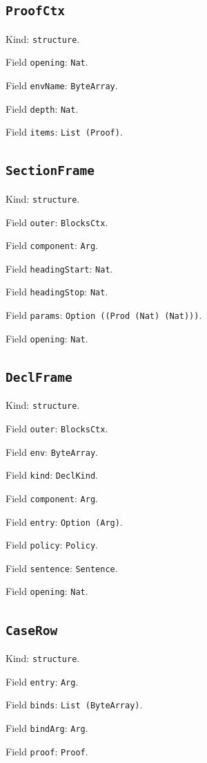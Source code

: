 \documentclass[11pt]{article}
\begin{document}
\subsection*{\texttt{ProofCtx}}
\noindent Kind: \texttt{structure}.\par
\noindent Field \texttt{opening}: \texttt{Nat}.\par
\noindent Field \texttt{envName}: \texttt{ByteArray}.\par
\noindent Field \texttt{depth}: \texttt{Nat}.\par
\noindent Field \texttt{items}: \texttt{List (Proof)}.\par
\subsection*{\texttt{SectionFrame}}
\noindent Kind: \texttt{structure}.\par
\noindent Field \texttt{outer}: \texttt{BlocksCtx}.\par
\noindent Field \texttt{component}: \texttt{Arg}.\par
\noindent Field \texttt{headingStart}: \texttt{Nat}.\par
\noindent Field \texttt{headingStop}: \texttt{Nat}.\par
\noindent Field \texttt{params}: \texttt{Option ((Prod (Nat) (Nat)))}.\par
\noindent Field \texttt{opening}: \texttt{Nat}.\par
\subsection*{\texttt{DeclFrame}}
\noindent Kind: \texttt{structure}.\par
\noindent Field \texttt{outer}: \texttt{BlocksCtx}.\par
\noindent Field \texttt{env}: \texttt{ByteArray}.\par
\noindent Field \texttt{kind}: \texttt{DeclKind}.\par
\noindent Field \texttt{component}: \texttt{Arg}.\par
\noindent Field \texttt{entry}: \texttt{Option (Arg)}.\par
\noindent Field \texttt{policy}: \texttt{Policy}.\par
\noindent Field \texttt{sentence}: \texttt{Sentence}.\par
\noindent Field \texttt{opening}: \texttt{Nat}.\par
\subsection*{\texttt{CaseRow}}
\noindent Kind: \texttt{structure}.\par
\noindent Field \texttt{entry}: \texttt{Arg}.\par
\noindent Field \texttt{binds}: \texttt{List (ByteArray)}.\par
\noindent Field \texttt{bindArg}: \texttt{Arg}.\par
\noindent Field \texttt{proof}: \texttt{Proof}.\par
\end{document}
